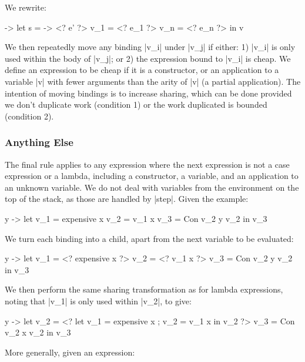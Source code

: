 \documentclass[draft]{sigplanconf}
\begin{document}
We rewrite:

\begin{code}
\free ->  let  s    = \x -> <? e' ?>
               v_1  = <? e_1 ?>
               v_n  = <? e_n ?>
          in   v
\end{code}

We then repeatedly move any binding |v_i| under |v_j| if either: 1) |v_i| is only used within the body of |v_j|; or 2) the expression bound to |v_i| is cheap. We define an expression to be cheap if it is a constructor, or an application to a variable |v| with fewer arguments than the arity of |v| (a partial application). The intention of moving bindings is to increase sharing, which can be done provided we don't duplicate work (condition 1) or the work duplicated is bounded (condition 2).

\subsubsection{Anything Else}
\label{sec:eval_split_other}

The final rule applies to any expression where the next expression is not a case expression or a lambda, including a constructor, a variable, and an application to an unknown variable. We do not deal with variables from the environment on the top of the stack, as those are handled by |step|. Given the example:

\begin{code}
\x y ->  let  v_1 = expensive x
              v_2 = v_1 x
              v_3 = Con v_2 y v_2
         in   v_3
\end{code}

We turn each binding into a child, apart from the next variable to be evaluated:

\begin{code}
\x y ->  let  v_1 = <? expensive x ?>
              v_2 = <? v_1 x ?>
              v_3 = Con v_2 y v_2
         in   v_3
\end{code}

We then perform the same sharing transformation as for lambda expressions, noting that |v_1| is only used within |v_2|, to give:

\begin{code}
\x y ->  let  v_2 = <? let v_1 = expensive x ; v_2 = v_1 x in v_2 ?>
              v_3 = Con v_2 x v_2
         in   v_3
\end{code}

More generally, given an expression:
\end{document}
